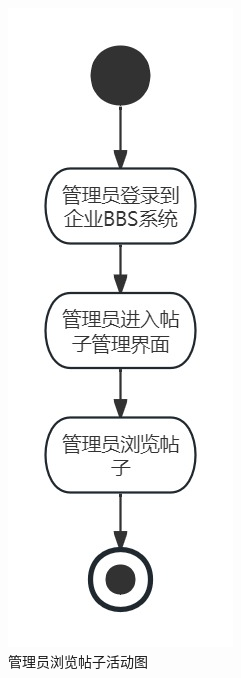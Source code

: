 \documentclass[UTF8]{ctexart}
\begin{document}
\begin{figure}[H]
  \centering
  \includegraphics[scale=0.25]{活动图/管理员浏览帖子活动图.jpg}
  \caption{管理员浏览帖子活动图}
\end{figure}
\end{document}

